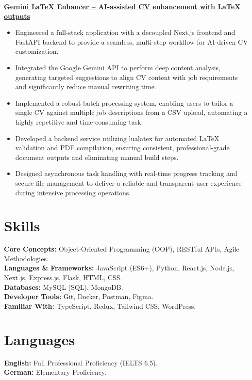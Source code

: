 \documentclass[a4paper,11pt]{article}
\begin{document}
\textbf{\href{https://github.com/NgnPhamGiaHuy/gemini-latex-enhancer}{Gemini LaTeX Enhancer – AI‑assisted CV enhancement with LaTeX outputs}}
\begin{itemize}[leftmargin=*, noitemsep, topsep=0pt, partopsep=0pt, parsep=0pt, itemsep=0pt]
    \item Engineered a full-stack application with a decoupled Next.js frontend and FastAPI backend to provide a seamless, multi-step workflow for AI-driven CV customization.
    \item Integrated the Google Gemini API to perform deep content analysis, generating targeted suggestions to align CV content with job requirements and significantly reduce manual rewriting time.
    \item Implemented a robust batch processing system, enabling users to tailor a single CV against multiple job descriptions from a CSV upload, automating a highly repetitive and time-consuming task.
    \item Developed a backend service utilizing lualatex for automated LaTeX validation and PDF compilation, ensuring consistent, professional-grade document outputs and eliminating manual build steps.
    \item Designed asynchronous task handling with real-time progress tracking and secure file management to deliver a reliable and transparent user experience during intensive processing operations.
\end{itemize}

\section*{Skills}
\textbf{Core Concepts:} Object-Oriented Programming (OOP), RESTful APIs, Agile Methodologies.\\
\textbf{Languages \& Frameworks:} JavaScript (ES6+), Python, React.js, Node.js, Next.js, Express.js, Flask, HTML, CSS.\\
\textbf{Databases:} MySQL (SQL), MongoDB.\\
\textbf{Developer Tools:} Git, Docker, Postman, Figma.\\
\textbf{Familiar With:} TypeScript, Redux, Tailwind CSS, WordPress.

\section*{Languages}
\textbf{English:} Full Professional Proficiency (IELTS 6.5).\\
\textbf{German:} Elementary Proficiency.
\end{document}
